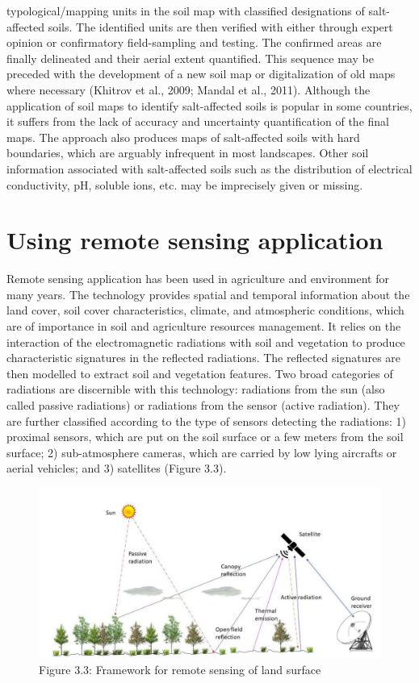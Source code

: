 \documentclass[
  10pt,
  b5paper,
]{book}
\begin{document}
typological/mapping units in the soil map with classified designations of salt-affected soils. The identified units are then verified with either through expert opinion or confirmatory field-sampling and testing. The confirmed areas are finally delineated and their aerial extent quantified. This sequence may be preceded with the development of a new soil map or digitalization of old maps where necessary (Khitrov et al., 2009; Mandal et al., 2011).
Although the application of soil maps to identify salt-affected soils is popular in some countries, it suffers from the lack of accuracy and uncertainty quantification of the final maps. The approach also produces maps of salt-affected soils with hard boundaries, which are arguably infrequent in most landscapes. Other soil information associated with salt-affected soils such as the distribution of electrical conductivity, pH, soluble ions, etc. may be imprecisely given or missing.

\hypertarget{using-remote-sensing-application}{%
\section{Using remote sensing application}\label{using-remote-sensing-application}}

Remote sensing application has been used in agriculture and environment for many years. The technology provides spatial and temporal information about the land cover, soil cover characteristics, climate, and atmospheric conditions, which are of importance in soil and agriculture resources management. It relies on the interaction of the electromagnetic radiations with soil and vegetation to produce characteristic signatures in the reflected radiations. The reflected signatures are then modelled to extract soil and vegetation features. Two broad categories of radiations are discernible with this technology: radiations from the sun (also called passive radiations) or radiations from the sensor (active radiation). They are further classified according to the type of sensors detecting the radiations: 1) proximal sensors, which are put on the soil surface or a few meters from the soil surface; 2) sub-atmosphere cameras, which are carried by low lying aircrafts or aerial vehicles; and 3) satellites (Figure 3.3).

\begin{figure}
\centering
\includegraphics{figures/images/Figure3.3.jpg}
\caption{Figure 3.3: Framework for remote sensing of land surface}
\end{figure}
\end{document}
